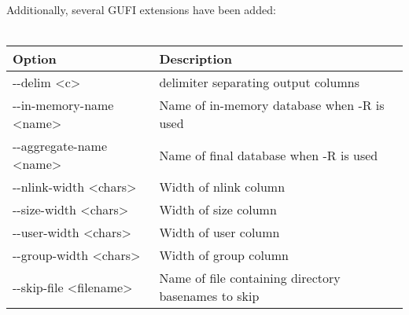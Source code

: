 Additionally, several GUFI extensions have been added:
\\\\
\begin{tabular} {| l | l |}
  \hline
  Option & Description \\
  \hline
  -{}-delim \textless c\textgreater & delimiter separating output columns \\
  \hline
  -{}-in-memory-name \textless name\textgreater & Name of in-memory
  database when -R is used \\
  \hline
  -{}-aggregate-name \textless name\textgreater & Name of final
  database when -R is used \\
  \hline
  -{}-nlink-width \textless chars\textgreater & Width of nlink column \\
  \hline
  -{}-size-width \textless chars\textgreater & Width of size column \\
  \hline
  -{}-user-width \textless chars\textgreater & Width of user column \\
  \hline
  -{}-group-width \textless chars\textgreater & Width of group column \\
  \hline
  -{}-skip-file \textless filename\textgreater & Name of file containing
  directory basenames to skip \\
  \hline
\end{tabular}
